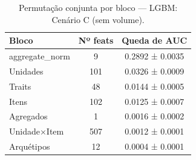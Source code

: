 \begin{table}[htbp]
\caption{Permutação conjunta por bloco — LGBM: Cenário C (sem volume).}
\label{tab:permlgbm_C}
\centering
\small
\begin{tabular}{lcc}
\toprule
Bloco & Nº feats & Queda de AUC \\
\midrule
aggregate\_norm & 9 & 0.2892 ± 0.0035 \\
Unidades & 101 & 0.0326 ± 0.0009 \\
Traits & 48 & 0.0144 ± 0.0005 \\
Itens & 102 & 0.0125 ± 0.0007 \\
Agregados & 1 & 0.0016 ± 0.0002 \\
Unidade×Item & 507 & 0.0012 ± 0.0001 \\
Arquétipos & 12 & 0.0004 ± 0.0001 \\
\bottomrule
\end{tabular}
\end{table}
